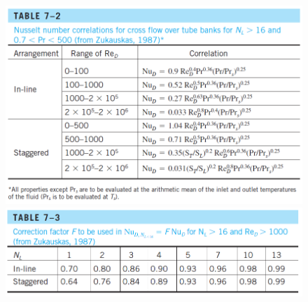 \begin{figure}[H]
    \centering
    \includegraphics[width=1.0\linewidth]{images/Table_7_2.png}
    \includegraphics[width=1.0\linewidth]{images/Table_7_3.png}
\end{figure}

